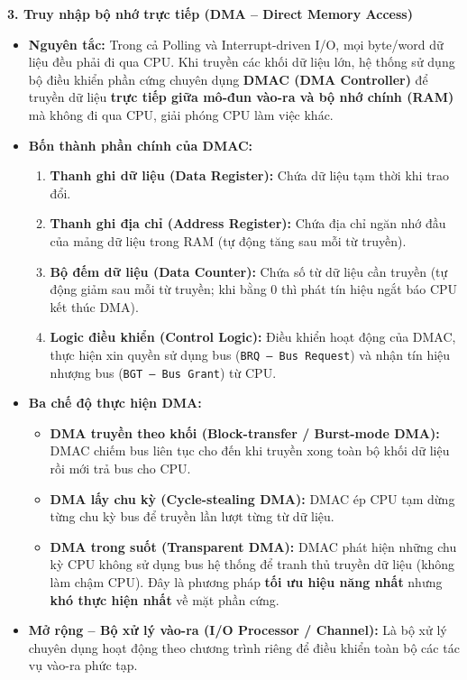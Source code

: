 \textbf{3. Truy nhập bộ nhớ trực tiếp (DMA -- Direct Memory Access)}
\begin{itemize}
    \item \textbf{Nguyên tắc:} Trong cả Polling và Interrupt-driven I/O, mọi byte/word dữ liệu đều phải đi qua CPU. Khi truyền các khối dữ liệu lớn, hệ thống sử dụng bộ điều khiển phần cứng chuyên dụng \textbf{DMAC (DMA Controller)} để truyền dữ liệu \textbf{trực tiếp giữa mô-đun vào-ra và bộ nhớ chính (RAM)} mà không đi qua CPU, giải phóng CPU làm việc khác.
    \item \textbf{Bốn thành phần chính của DMAC:}
    \begin{enumerate}[label=\arabic*.]
        \item \textbf{Thanh ghi dữ liệu (Data Register):} Chứa dữ liệu tạm thời khi trao đổi.
        \item \textbf{Thanh ghi địa chỉ (Address Register):} Chứa địa chỉ ngăn nhớ đầu của mảng dữ liệu trong RAM (tự động tăng sau mỗi từ truyền).
        \item \textbf{Bộ đếm dữ liệu (Data Counter):} Chứa số từ dữ liệu cần truyền (tự động giảm sau mỗi từ truyền; khi bằng $0$ thì phát tín hiệu ngắt báo CPU kết thúc DMA).
        \item \textbf{Logic điều khiển (Control Logic):} Điều khiển hoạt động của DMAC, thực hiện xin quyền sử dụng bus (\texttt{BRQ -- Bus Request}) và nhận tín hiệu nhượng bus (\texttt{BGT -- Bus Grant}) từ CPU.
    \end{enumerate}
    \item \textbf{Ba chế độ thực hiện DMA:}
    \begin{itemize}
        \item \textbf{DMA truyền theo khối (Block-transfer / Burst-mode DMA):} DMAC chiếm bus liên tục cho đến khi truyền xong toàn bộ khối dữ liệu rồi mới trả bus cho CPU.
        \item \textbf{DMA lấy chu kỳ (Cycle-stealing DMA):} DMAC ép CPU tạm dừng từng chu kỳ bus để truyền lần lượt từng từ dữ liệu.
        \item \textbf{DMA trong suốt (Transparent DMA):} DMAC phát hiện những chu kỳ CPU không sử dụng bus hệ thống để tranh thủ truyền dữ liệu (không làm chậm CPU). Đây là phương pháp \textbf{tối ưu hiệu năng nhất} nhưng \textbf{khó thực hiện nhất} về mặt phần cứng.
    \end{itemize}
    \item \textbf{Mở rộng -- Bộ xử lý vào-ra (I/O Processor / Channel):} Là bộ xử lý chuyên dụng hoạt động theo chương trình riêng để điều khiển toàn bộ các tác vụ vào-ra phức tạp.
\end{itemize}

